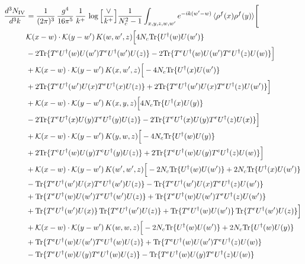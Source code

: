 \documentclass[9pt]{article}
\numberwithin{equation}{section}
\begin{document}
{\color{blue}
\begin{align}
    \frac{d^{3}N_{\rm IV}}{d^{3}k} & = \frac{1}{(2\pi)^{3}}\,\frac{g^{4}}{16\pi^{5}}\,\frac{1}{k^{+}}\,\log{\left[\frac{\vee}{k^{+}}\right]}\frac{1}{N_c^2-1}\int_{x,y,z,w,w'}e^{-ik(w'-w)}\,\langle\rho^f(x)\rho^f(y)\rangle\Bigg[\notag \\ & \mathcal K(x-w)\cdot\mathcal K(y-w')\,K(w,w',z)\Big[4 N_c{\rm Tr}\{U^\dagger(w)U(w')\}\notag\\
&-2{\rm Tr}\{T^eU^\dagger(w)U(w')T^eU^\dagger(w')U(z)\}-2{\rm Tr}\{T^eU^\dagger(w)U(w')T^eU^\dagger(z)U(w)\}\Big]\notag\\
&+\mathcal K(x-w)\cdot\mathcal K(y-w')\,K(x,w',z)\Big[-4 N_c{\rm Tr}\{U^\dagger(x)U(w')\}\notag\\
&+2{\rm Tr}\{T^eU^\dagger(w')U(x)T^eU^\dagger(x)U(z)\}+2{\rm Tr}\{T^eU^\dagger(w')U(x)T^eU^\dagger(z)U(w')\}\Big]\notag\\
&+\mathcal K(x-w)\cdot\mathcal K(y-w')\,K(x,y,z)\Big[4 N_c{\rm Tr}\{U^\dagger(x)U(y)\}\notag\\
&-2{\rm Tr}\{T^eU^\dagger(x)U(y)T^eU^\dagger(y)U(z)\}-2{\rm Tr}\{T^eU^\dagger(x)U(y)T^eU^\dagger(z)U(x)\}\Big]\notag\\
&+\mathcal K(x-w)\cdot\mathcal K(y-w')\,K(y,w,z)\Big[-4 N_c{\rm Tr}\{U^\dagger(w)U(y)\}\notag\\
&+2{\rm Tr}\{T^eU^\dagger(w)U(y)T^eU^\dagger(y)U(z)\}+2{\rm Tr}\{T^eU^\dagger(w)U(y)T^eU^\dagger(z)U(w)\}\Big]\notag\\
&+\mathcal K(x-w)\cdot\mathcal K(y-w')\,K(w',w',z)\Big[-2 N_c{\rm Tr}\{U^\dagger(w)U(w')\}+2 N_c{\rm Tr}\{U^\dagger(x)U(w')\}\notag\\
&-{\rm Tr}\{T^eU^\dagger(w')U(x)T^eU^\dagger(w')U(z)\}-{\rm Tr}\{T^eU^\dagger(w')U(x)T^eU^\dagger(z)U(w')\}\notag\\
&+{\rm Tr}\{T^eU^\dagger(w)U(w')T^eU^\dagger(w')U(z)\}+{\rm Tr}\{T^eU^\dagger(w)U(w')T^eU^\dagger(z)U(w')\}\notag\\
&+{\rm Tr}\{T^eU^\dagger(w')U(x)\}\,{\rm Tr}\{T^eU^\dagger(w')U(z)\}+{\rm Tr}\{T^eU^\dagger(w)U(w')\}\,{\rm Tr}\{T^eU^\dagger(w')U(z)\}\Big]\notag\\
&+\mathcal K(x-w)\cdot\mathcal K(y-w')\,K(w,w,z)\Big[-2 N_c{\rm Tr}\{U^\dagger(w)U(w')\}+2 N_c{\rm Tr}\{U^\dagger(w)U(y)\}\notag\\
&+{\rm Tr}\{T^eU^\dagger(w)U(w')T^eU^\dagger(w)U(z)\}+{\rm Tr}\{T^eU^\dagger(w)U(w')T^eU^\dagger(z)U(w)\}\notag\\
&-{\rm Tr}\{T^eU^\dagger(w)U(y)T^eU^\dagger(w)U(z)\}-{\rm Tr}\{T^eU^\dagger(w)U(y)T^eU^\dagger(z)U(w)\}\notag\\

\end{align}}
\end{document}
